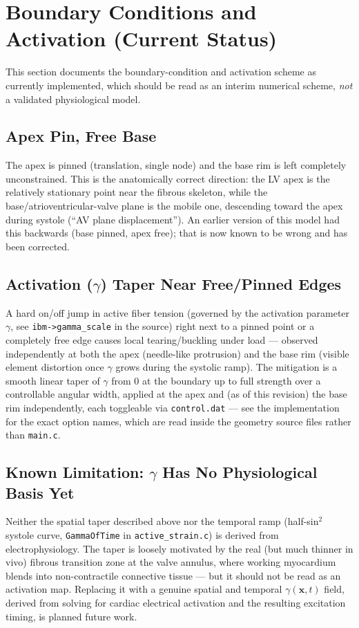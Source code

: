 \documentclass[11pt,a4paper]{article}
\newcommand{\bx}{\mathbf{x}}
\begin{document}
\section{Boundary Conditions and Activation (Current Status)}
\label{sec:bc-status}

This section documents the boundary-condition and activation scheme as
currently implemented, which should be read as an interim numerical
scheme, \emph{not} a validated physiological model.

\subsection{Apex Pin, Free Base}
The apex is pinned (translation, single node) and the base rim is left
completely unconstrained. This is the anatomically correct direction: the
LV apex is the relatively stationary point near the fibrous skeleton, while
the base/atrioventricular-valve plane is the mobile one, descending toward
the apex during systole (``AV plane displacement''). An earlier version of
this model had this backwards (base pinned, apex free); that is now known
to be wrong and has been corrected.

\subsection{Activation ($\gamma$) Taper Near Free/Pinned Edges}
A hard on/off jump in active fiber tension (governed by the activation
parameter $\gamma$, see \texttt{ibm->gamma\_scale} in the source) right next
to a pinned point or a completely free edge causes local tearing/buckling
under load — observed independently at both the apex (needle-like
protrusion) and the base rim (visible element distortion once $\gamma$
grows during the systolic ramp). The mitigation is a smooth linear taper of
$\gamma$ from 0 at the boundary up to full strength over a controllable
angular width, applied at the apex and (as of this revision) the base rim
independently, each toggleable via \texttt{control.dat} — see the
implementation for the exact option names, which are read inside the
geometry source files rather than \texttt{main.c}.

\subsection{Known Limitation: $\gamma$ Has No Physiological Basis Yet}
Neither the spatial taper described above nor the temporal ramp
(half-sin$^2$ systole curve, \texttt{GammaOfTime} in
\texttt{active\_strain.c}) is derived from electrophysiology. The taper is
loosely motivated by the real (but much thinner in vivo) fibrous transition
zone at the valve annulus, where working myocardium blends into
non-contractile connective tissue — but it should not be read as an
activation map. Replacing it with a genuine spatial and temporal $\gamma(\bx,t)$
field, derived from solving for cardiac electrical activation and the
resulting excitation timing, is planned future work.
\end{document}
